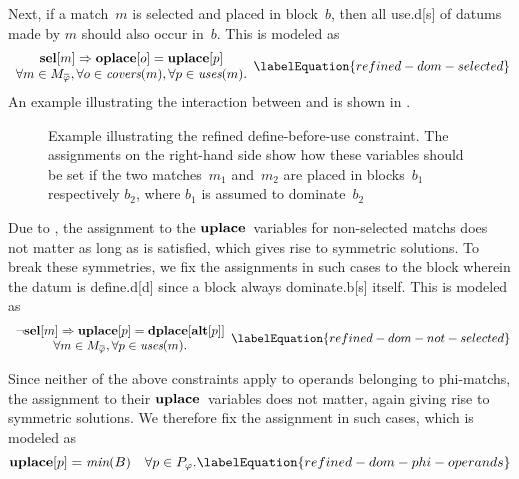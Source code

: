 Next, if a \gls{match}~$m$ is selected and placed in \gls{block}~$b$, then all
\gls{use.d}[s] of \glspl{datum} made by $m$ should also occur in~$b$.
%
This is modeled as
%
\begin{equation}
  \begin{array}{c}
    \mVar{sel}[m] \mImp \mVar{oplace}[o] = \mVar{uplace}[p] \\
    \forall m \in \mPhiMatchCompSet,
    \forall o \in \mCovers(m),
    \forall p \in \mUses(m).
  \end{array}
  \labelEquation{refined-dom-selected}
\end{equation}
%
An example illustrating the interaction between  and
 is shown in .

\begin{figure}
  \centering%

  \caption[Example illustrating the refined define-before-use constraint]%
          {%
            Example illustrating the refined define-before-use constraint.
            The assignments on the right-hand side show how these
            variables should be set if the two matches~$m_1$ and~$m_2$ are
            placed in blocks~$b_1$ respectively $b_2$, where $b_1$ is assumed to
            dominate~$b_2$%
          }
\end{figure}

Due to , the assignment to the
$\mVar{uplace}$~\glspl{variable} for non-selected \glspl{match} does not matter
as long as  is satisfied, which gives rise to symmetric
\glspl{solution}.
%
To break these symmetries, we fix the assignments in such cases to the
\gls{block} wherein the \gls{datum} is \gls{define.d}[d] since a \gls{block}
always \gls{dominate.b}[s] itself.
%
This is modeled as
%
\begin{equation}
  \begin{array}{c}
    \neg\mVar{sel}[m] \mImp \mVar{uplace}[p] = \mVar{dplace}[\mVar{alt}[p]] \\
    \forall m \in \mPhiMatchCompSet,
    \forall p \in \mUses(m).
  \end{array}
  \labelEquation{refined-dom-not-selected}
\end{equation}

Since neither of the above \glspl{constraint} apply to \glspl{operand} belonging
to \glspl{phi-match}, the assignment to their $\mVar{uplace}$~\glspl{variable}
does not matter, again giving rise to symmetric \glspl{solution}.
%
We therefore fix the assignment in such cases, which is modeled as
%
\begin{equation}
  \mVar{uplace}[p] = \mMin(\mBlockSet)
  \mQuantSep
  \forall p \in \mPhiOperandSet.
  \labelEquation{refined-dom-phi-operands}
\end{equation}


